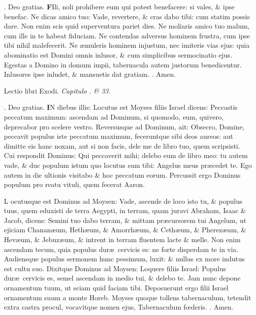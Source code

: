\documentclass[letter,11pt]{book}
\makeatletter
\DeclareRobustCommand{\Rbar}{\vers@resp{0pt}{R}}
\newcommand{\vers@resp@sym}{\raisebox{0.2ex}{\rotatebox[origin=c]{-20}{$\m@th\rceil$}}}
\newcommand{\vers@resp}[2]{%
  {\ooalign{\hidewidth\kern#1\vers@resp@sym\hidewidth\cr#2\cr}}%
}%
\def\R{\color{Red} \Rbar . \color{black}}
\makeatother
\begin{document}
\begin{multicols*}{2}
\par \noindent \R Deo gratias.
\lettrine[lines=2]{\bfseries \color{Red} F}{}Ili, noli prohibere eum qui potest benefacere: si vales, \& ipse benefac. Ne dicas amico tuo: Vade, revertere, \& cras dabo tibi: cum statim possis dare. Non enim scis quid superventura pariet dies. Ne moliaris amico tuo malum, cum ille in te habeat fiduciam. Ne contendas adversus hominem frustra, cum ipse tibi nihil malefecerit. Ne \ae muleris hominem injustum, nec imiteris vias ejus: quia abominatio est Domini omnis inlusor, \& cum simplicibus sermocinatio ejus. Egestas a Domino in domum impii, tabernacula autem justorum benedicentur. Inlusores ipse inludet, \& mansuetis dat gratiam. \R Amen.
\vspace{-.5em} \begin{center} {\color{Red} L}ectio libri Exodi. \itshape Capitulo . \& 33. \color{black} \end{center} \vspace{-.5em}
\par \noindent \R Deo gratias.
\lettrine[lines=2]{\bfseries \color{Red} I}{}N diebus illis: Locutus est Moyses filiis Israel dicens: Peccastis peccatum maximum: ascendam ad Dominum, si quomodo, eum, quivero, deprecabor pro scelere vestro. Reversusque ad Dominum, ait: Obsecro, Domine, peccavit populus iste peccatum maximum, feceruntque sibi deos aureos: aut dimitte eis hanc noxam, aut si non facis, dele me de libro tuo, quem scripsisti. Cui respondit Dominus: Qui peccaverit mihi; delebo eum de libro meo: tu autem vade, \& duc populum istum quo locutus sum tibi: Angelus meus pr\ae cedet te. Ego autem in die ultionis visitabo \& hoc peccatum eorum. Percussit ergo Dominus populum pro reatu vituli, quem fecerat Aaron.
\par \color{Red} L\color{black} ocutusque est Dominus ad Moysen: Vade, ascende de loco isto tu, \& populus tuus, quem eduxisti de terra Aegypti, in terram, quam juravi Abraham, Isaac \& Jacob, dicens: Semini tuo dabo terram, \& mittam pr\ae cursorem tui Angelum, ut ejiciam Chanan\ae um, Heth\ae um, \& Amorrh\ae um, \& Ceth\ae um, \& Pherez\ae um, \& Hev\ae um, \& Jebuz\ae um, \& intrent in terram fluentem lacte \& melle. Non enim ascendam tecum, quia populus dur\ae \ cervicis es: ne forte disperdam te in via. Audiensque populus
sermonem hunc pessimum, luxit: \& nullus ex more indutus est cultu suo. Dixitque Dominus ad Moysen: Loquere filiis Israel: Populus dur\ae \ cervicis es, semel ascendam in medio tui, \& delebo te. Jam nunc depone ornamentum tuum, ut sciam quid faciam tibi. Deposuerunt ergo filii Israel ornamentum suum a monte Horeb. Moyses quoque tollens tabernaculum, tetendit extra castra procul, vocavitque nomen ejus, Tabernaculum f\oe deris. \R Amen.

\end{multicols*}
\end{document}
